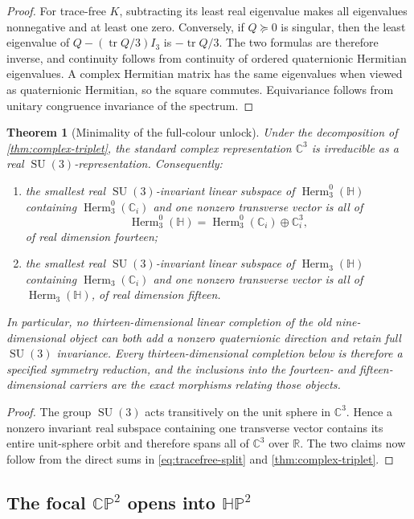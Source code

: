 \documentclass[11pt]{article}
\newtheorem{theorem}{Theorem}[section]
\theoremstyle{definition}
\theoremstyle{remark}
\newcommand{\R}{\mathbb R}
\newcommand{\C}{\mathbb C}
\newcommand{\Hh}{\mathbb H}
\newcommand{\CP}{\mathbb{CP}}
\newcommand{\HP}{\mathbb{HP}}
\newcommand{\Herm}{\operatorname{Herm}}
\newcommand{\tr}{\operatorname{tr}}
\newcommand{\SU}{\operatorname{SU}}
\begin{document}
\begin{proof}
For trace-free $K$, subtracting its least real eigenvalue makes all eigenvalues
nonnegative and at least one zero.  Conversely, if $Q\succeq0$ is singular,
then the least eigenvalue of
$Q-(\tr Q/3)I_3$ is $-\tr Q/3$.  The two formulas are therefore inverse, and
continuity follows from continuity of ordered quaternionic Hermitian
eigenvalues.  A complex Hermitian matrix has the same eigenvalues when viewed
as quaternionic Hermitian, so the square commutes.  Equivariance follows from
unitary congruence invariance of the spectrum.
\end{proof}

\begin{theorem}[Minimality of the full-colour unlock]\label{thm:colour-minimality}
Under the decomposition of \cref{thm:complex-triplet}, the standard complex
representation $\C^3$ is irreducible as a real $\SU(3)$-representation.
Consequently:
\begin{enumerate}
\item the smallest real $\SU(3)$-invariant linear subspace of
$\Herm_3^0(\Hh)$ containing $\Herm_3^0(\C_i)$ and one nonzero transverse
vector is all of
\[
 \Herm_3^0(\Hh)=\Herm_3^0(\C_i)\oplus\C_i^3,
\]
of real dimension fourteen;
\item the smallest real $\SU(3)$-invariant linear subspace of
$\Herm_3(\Hh)$ containing $\Herm_3(\C_i)$ and one nonzero transverse vector
is all of $\Herm_3(\Hh)$, of real dimension fifteen.
\end{enumerate}
In particular, no thirteen-dimensional linear completion of the old
nine-dimensional object can both add a nonzero quaternionic direction and
retain full $\SU(3)$ invariance.  Every thirteen-dimensional completion below
is therefore a specified symmetry reduction, and the inclusions into the
fourteen- and fifteen-dimensional carriers are the exact morphisms relating
those objects.
\end{theorem}

\begin{proof}
The group $\SU(3)$ acts transitively on the unit sphere in $\C^3$.  Hence a
nonzero invariant real subspace containing one transverse vector contains its
entire unit-sphere orbit and therefore spans all of $\C^3$ over $\R$.  The two
claims now follow from the direct sums in
\eqref{eq:tracefree-split} and \cref{thm:complex-triplet}.
\end{proof}

\subsection{The focal \texorpdfstring{$\CP^2$}{CP2} opens into \texorpdfstring{$\HP^2$}{HP2}}
\end{document}
